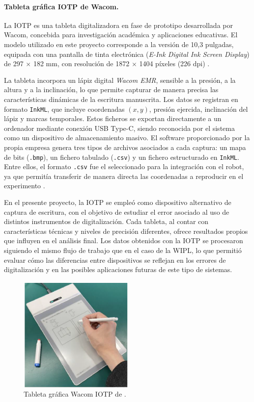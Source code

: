 \documentclass[12pt,a4paper,oneside]{report}
\begin{document}
\paragraph{Tableta gráfica \acrfull{IOTP} de Wacom.}La \acrfull{IOTP} es una tableta digitalizadora en fase de prototipo desarrollada por Wacom, 
concebida para investigación académica y aplicaciones educativas. El modelo utilizado en este 
proyecto corresponde a la versión de 10,3 pulgadas, equipada con una pantalla de tinta electrónica 
(\textit{E-Ink Digital Ink Screen Display}) de 297 $\times$ 182 mm, con resolución de 
1872 $\times$ 1404 píxeles (226 dpi) \cite{iotp_manual}.  

La tableta incorpora un lápiz digital \textit{Wacom EMR}, sensible a la presión, a la altura 
y a la inclinación, lo que permite capturar de manera precisa las características dinámicas de la 
escritura manuscrita. Los datos se registran en formato \texttt{InkML}, que incluye coordenadas 
$(x,y)$, presión ejercida, inclinación del lápiz y marcas temporales. Estos ficheros se exportan 
directamente a un ordenador mediante conexión USB Type-C, siendo reconocida por el sistema como 
un dispositivo de almacenamiento masivo. El software proporcionado por la propia empresa genera 
tres tipos de archivos asociados a cada captura: un mapa de bits (\texttt{.bmp}), un fichero 
tabulado (\texttt{.csv}) y un fichero estructurado en \texttt{InkML}. Entre ellos, el formato 
\texttt{.csv} fue el seleccionado para la integración con el robot, ya que permitía transferir 
de manera directa las coordenadas a reproducir en el experimento \cite{iotp_manual}.

En el presente proyecto, la \acrshort{IOTP} se empleó como dispositivo alternativo de 
captura de escritura, con el objetivo de estudiar el error asociado al uso de distintos 
instrumentos de digitalización. Cada tableta, al contar con características técnicas y 
niveles de precisión diferentes, ofrece resultados propios que influyen en el análisis 
final. Los datos obtenidos con la \acrshort{IOTP} se procesaron siguiendo el mismo flujo 
de trabajo que en el caso de la \acrshort{WIPL}, lo que permitió evaluar cómo las 
diferencias entre dispositivos se reflejan en los errores de digitalización y en las 
posibles aplicaciones futuras de este tipo de sistemas.

\begin{figure}[H]
\centering
\includegraphics[width=0.5\textwidth]{figuras/IOTP.png}
\caption{Tableta gráfica Wacom IOTP de \cite{iotp_manual}.}
\label{fig:IOTP}
\end{figure}
\end{document}
